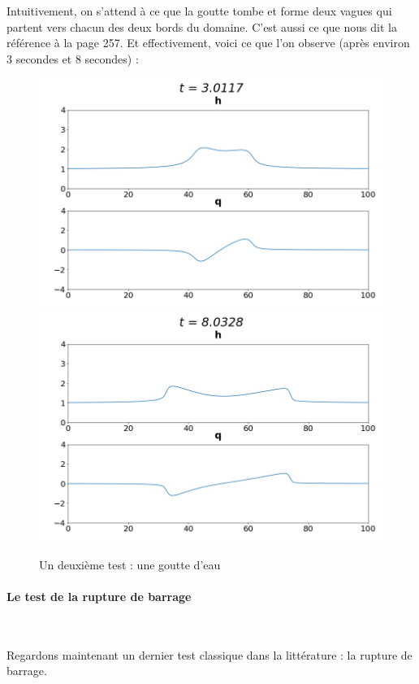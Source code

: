 \documentclass[
11pt, %
francais, %
singlespacing, %
headsepline, %
]{MastersDoctoralThesis} %
\begin{document}
Intuitivement, on s'attend à ce que la \og goutte \fg{} tombe et forme deux vagues qui partent vers chacun des deux bords du domaine.
C'est aussi ce que nous dit la référence \cite{RL} à la page 257. Et effectivement, voici ce que l'on observe (après environ 3 secondes et 8 secondes) :

\begin{figure}
\includegraphics[scale = .6]{"bosse4.png"}
\includegraphics[scale = .6]{"bosse10.png"} 
\caption{Un deuxième test : une goutte d'eau}
\end{figure}

\paragraph{Le test de la rupture de barrage} \

Regardons maintenant un dernier test classique dans la littérature : la rupture de barrage.
\end{document}
